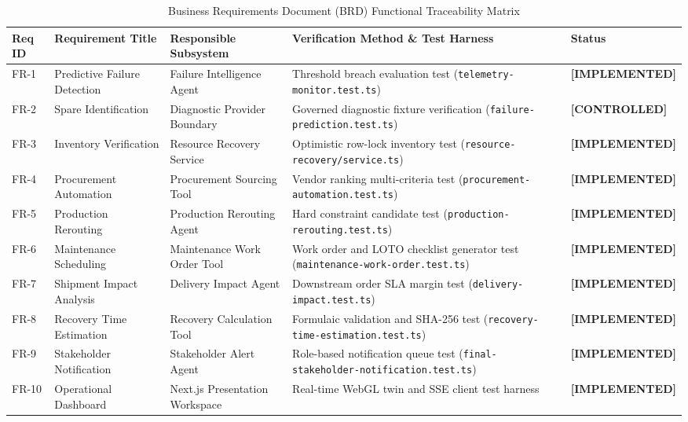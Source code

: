 \documentclass[10pt,twocolumn,a4paper]{article}
\newcommand{\claimtag}[1]{%
    \textsf{\textbf{\scriptsize\color{deepslate}[#1]}}%
}
\begin{document}
\begin{table}[t]
\centering
\scriptsize
\caption{Business Requirements Document (BRD) Functional Traceability Matrix\label{tab:brd_matrix}}
\begin{tabularx}{\textwidth}{lp{3.5cm}p{3.5cm}Xl}
\toprule
\textbf{Req ID} & \textbf{Requirement Title} & \textbf{Responsible Subsystem} & \textbf{Verification Method \& Test Harness} & \textbf{Status} \\
\midrule
FR-1 & Predictive Failure Detection & Failure Intelligence Agent & Threshold breach evaluation test (\texttt{telemetry-monitor.test.ts}) & \claimtag{IMPLEMENTED} \\
FR-2 & Spare Identification & Diagnostic Provider Boundary & Governed diagnostic fixture verification (\texttt{failure-prediction.test.ts}) & \claimtag{CONTROLLED} \\
FR-3 & Inventory Verification & Resource Recovery Service & Optimistic row-lock inventory test (\texttt{resource-recovery/service.ts}) & \claimtag{IMPLEMENTED} \\
FR-4 & Procurement Automation & Procurement Sourcing Tool & Vendor ranking multi-criteria test (\texttt{procurement-automation.test.ts}) & \claimtag{IMPLEMENTED} \\
FR-5 & Production Rerouting & Production Rerouting Agent & Hard constraint candidate test (\texttt{production-rerouting.test.ts}) & \claimtag{IMPLEMENTED} \\
FR-6 & Maintenance Scheduling & Maintenance Work Order Tool & Work order and LOTO checklist generator test (\texttt{maintenance-work-order.test.ts}) & \claimtag{IMPLEMENTED} \\
FR-7 & Shipment Impact Analysis & Delivery Impact Agent & Downstream order SLA margin test (\texttt{delivery-impact.test.ts}) & \claimtag{IMPLEMENTED} \\
FR-8 & Recovery Time Estimation & Recovery Calculation Tool & Formulaic validation and SHA-256 test (\texttt{recovery-time-estimation.test.ts}) & \claimtag{IMPLEMENTED} \\
FR-9 & Stakeholder Notification & Stakeholder Alert Agent & Role-based notification queue test (\texttt{final-stakeholder-notification.test.ts}) & \claimtag{IMPLEMENTED} \\
FR-10 & Operational Dashboard & Next.js Presentation Workspace & Real-time WebGL twin and SSE client test harness & \claimtag{IMPLEMENTED} \\
\bottomrule
\end{tabularx}
\end{table}
\end{document}
